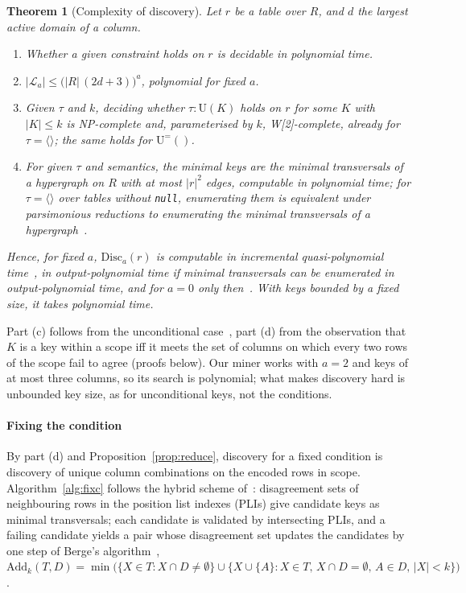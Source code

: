\documentclass[conference]{IEEEtran}
\newtheorem{theorem}{Theorem}
\theoremstyle{definition}
\newcommand{\nul}{\texttt{null}}
\newcommand{\U}[1]{\mathrm{U}(#1)}
\newcommand{\Ueq}[1]{\mathrm{U}^{=}(#1)}
\newcommand{\tpl}[1]{\ensuremath{\langle #1\rangle}}
\begin{document}
\begin{theorem}[Complexity of discovery]\label{thm:disc}
Let $r$ be a table over $R$, and $d$ the largest active domain of a column.
\begin{enumerate}
\item[(a)] Whether a given constraint holds on $r$ is decidable in polynomial time.
\item[(b)] $|\mathcal L_a|\le\big(|R|\,(2d+3)\big)^a$, polynomial for fixed $a$.
\item[(c)] Given $\tau$ and $k$, deciding whether $\tau:\U{K}$ holds on $r$ for some $K$ with $|K|\le k$
  is NP-complete and, parameterised by $k$, W[2]-complete, already for $\tau=\tpl{}$; the same
  holds for $\Ueq{}$.
\item[(d)] For given $\tau$ and semantics, the minimal keys are the minimal transversals of a
  hypergraph on $R$ with at most $|r|^2$ edges, computable in polynomial time; for $\tau=\tpl{}$
  over tables without \nul, enumerating them is equivalent under parsimonious reductions to
  enumerating the minimal transversals of a hypergraph~\cite{BFS22}.
\end{enumerate}
Hence, for fixed $a$, $\mathrm{Disc}_a(r)$ is computable in incremental quasi-polynomial
time~\cite{FK96}, in output-polynomial time if minimal transversals can be enumerated in
output-polynomial time, and for $a=0$ only then~\cite{EG95}. With keys bounded by a fixed
size, it takes polynomial time.
\end{theorem}

Part (c) follows from the unconditional case~\cite{BFS22,SR92}, part (d) from the observation
that $K$ is a key within a scope iff it meets the set of columns on which every two rows of the
scope fail to agree (proofs below). Our miner works with $a=2$ and keys
of at most three columns, so its search is polynomial; what makes discovery hard is unbounded
key size, as for unconditional keys, not the conditions.

\paragraph*{Fixing the condition} By part (d) and Proposition~\ref{prop:reduce}, discovery for
a fixed condition is discovery of unique column combinations on the encoded rows in scope.
Algorithm~\ref{alg:fixc} follows the hybrid scheme of~\cite{PN17}: disagreement sets of
neighbouring rows in the position list indexes (PLIs) give candidate keys as minimal
transversals; each candidate is validated by intersecting PLIs, and a failing candidate yields
a pair whose disagreement set updates the candidates by one step of Berge's
algorithm~\cite{Ber89}, $\mathrm{Add}_k(T,D)=\min\big(\{X\in T:X\cap D\ne\emptyset\}\cup\{X\cup\{A\}:X\in
T,\,X\cap D=\emptyset,\,A\in D,\,|X|<k\}\big)$.
\end{document}
